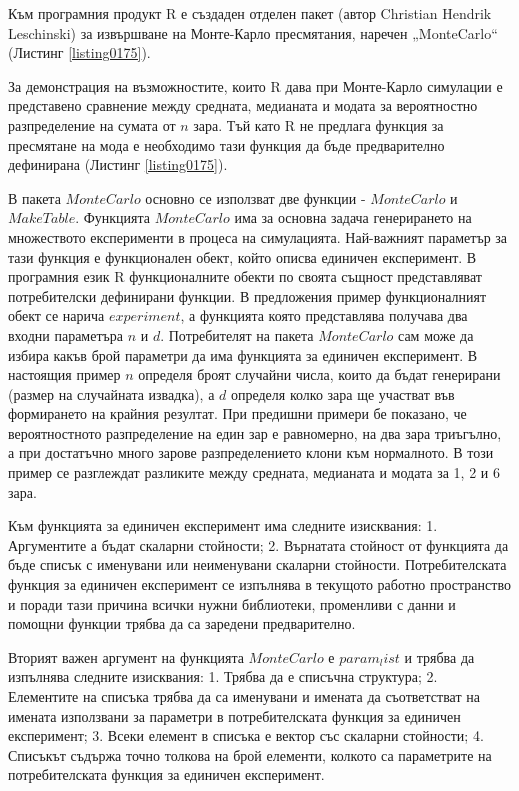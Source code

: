 Към програмния продукт R е създаден отделен пакет (автор Christian Hendrik Leschinski) за извършване на Монте-Карло пресмятания, наречен „MonteCarlo“ (Листинг \ref{listing0175}). 

За демонстрация на възможностите, които R дава при Монте-Карло симулации е представено сравнение между средната, медианата и модата за вероятностно разпределение на сумата от $n$ зара. Тъй като R не предлага функция за пресмятане на мода е необходимо тази функция да бъде предварително дефинирана (Листинг \ref{listing0175}).

В пакета $MonteCarlo$ основно се използват две функции - $MonteCarlo$ и $MakeTable$. Функцията $MonteCarlo$ има за основна задача генерирането на множеството експерименти в процеса на симулацията. Най-важният параметър за тази функция е функционален обект, който описва единичен експеримент. В програмния език R функционалните обекти по своята същност представляват потребителски дефинирани функции. В предложения пример функционалният обект се нарича $experiment$, а функцията която представлява получава два входни параметъра $n$ и $d$. Потребителят на пакета $MonteCarlo$ сам може да избира какъв брой параметри да има функцията за единичен експеримент. В настоящия пример $n$ определя броят случайни числа, които да бъдат генерирани (размер на случайната извадка), а $d$ определя колко зара ще участват във формирането на крайния резултат. При предишни примери бе показано, че вероятностното разпределение на един зар е равномерно, на два зара триъгълно, а при достатъчно много зарове разпределението клони към нормалното. В този пример се разглеждат разликите между средната, медианата и модата за 1, 2 и 6 зара.

Към функцията за единичен експеримент има следните изисквания: 1. Аргументите а бъдат скаларни стойности; 2. Върнатата стойност от функцията да бъде списък с именувани или неименувани скаларни стойности. Потребителската функция за единичен експеримент се изпълнява в текущото работно пространство и поради тази причина всички нужни библиотеки, променливи с данни и помощни функции трябва да са заредени предварително. 

Вторият важен аргумент на функцията $MonteCarlo$ е $param_list$ и трябва да изпълнява следните изисквания: 1. Трябва да е списъчна структура; 2. Елементите на списъка трябва да са именувани и имената да съответстват на имената използвани за параметри в потребителската функция за единичен експеримент; 3. Всеки елемент в списъка е вектор със скаларни стойности; 4. Списъкът съдържа точно толкова на брой елементи, колкото са параметрите на потребителската функция за единичен експеримент. 

